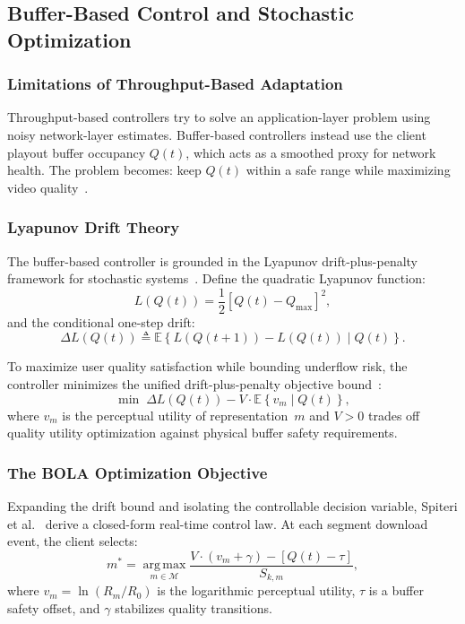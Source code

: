 \documentclass[conference]{IEEEtran}
\begin{document}
\subsection{Buffer-Based Control and Stochastic Optimization}

\subsubsection{Limitations of Throughput-Based Adaptation}

Throughput-based controllers try to solve an application-layer problem
using noisy network-layer estimates.  Buffer-based controllers instead use
the client playout buffer occupancy $Q(t)$, which acts as a smoothed
proxy for network health.  The problem becomes: keep $Q(t)$ within a safe
range while maximizing video quality~\cite{spiteri2020}.

\subsubsection{Lyapunov Drift Theory}
The buffer-based controller is grounded in the Lyapunov drift-plus-penalty framework for stochastic systems~\cite{neely2010}.  Define the quadratic Lyapunov function:
\begin{equation}
  L(Q(t)) = \frac{1}{2}\left[Q(t) - Q_{\max}\right]^2,
  \label{eq:lyapunov}
\end{equation}
and the conditional one-step drift:
\begin{equation}
  \Delta L(Q(t)) \triangleq \mathbb{E}\!\left\{L(Q(t{+}1)) - L(Q(t)) \mid Q(t)\right\}.
  \label{eq:drift}
\end{equation}

To maximize user quality satisfaction while bounding underflow risk, the controller minimizes the unified drift-plus-penalty objective bound~\cite{neely2010}:
\begin{equation}
  \min \; \Delta L(Q(t)) - V \cdot \mathbb{E}\!\left\{v_m \mid Q(t)\right\},
  \label{eq:dpp}
\end{equation}
where $v_m$ is the perceptual utility of representation~$m$ and $V>0$ trades off quality utility optimization against physical buffer safety requirements.

\subsubsection{The BOLA Optimization Objective}

Expanding the drift bound and isolating the controllable decision variable,
Spiteri et al.~\cite{spiteri2020} derive a closed-form real-time control
law.  At each segment download event, the client selects:
\begin{equation}
  m^*=\operatorname*{arg\,max}_{m\in\mathcal{M}}
    \frac{V\cdot(v_m+\gamma)-\left[Q(t)-\tau\right]}{S_{k,m}},
  \label{eq:bola_objective}
\end{equation}
where $v_m=\ln(R_m/R_0)$ is the logarithmic perceptual utility,
$\tau$ is a buffer safety offset, and $\gamma$ stabilizes quality
transitions.
\end{document}

